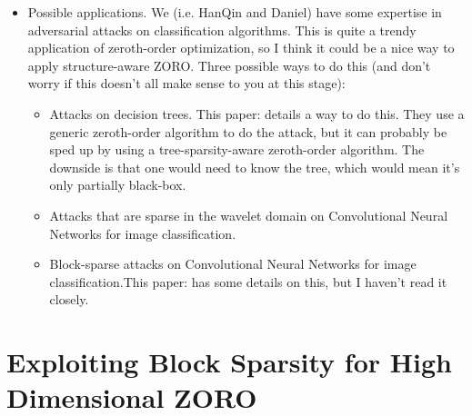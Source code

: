 \documentclass{article}
\begin{document}
\begin{itemize}
\item Possible applications. We (i.e. HanQin and Daniel) have some expertise in adversarial attacks on classification algorithms. This is quite a trendy application of zeroth-order optimization, so I think it could be a nice way to apply structure-aware ZORO. Three possible ways to do this (and don't worry if this doesn't all make sense to you at this stage):
	\begin{itemize}
		\item Attacks on decision trees. This paper: \cite{cheng2018query} details a way to do this. They use a generic zeroth-order algorithm to do the attack, but it can probably be sped up by using a tree-sparsity-aware zeroth-order algorithm. The downside is that one would need to know the tree, which would mean it's only partially black-box.
		\item Attacks that are sparse in the wavelet domain on Convolutional Neural Networks for image classification.
		\item Block-sparse attacks on Convolutional Neural Networks for image classification.This paper: \cite{xu2018structured} has some details on this, but I haven't read it closely.
	\end{itemize} 

\end{itemize}

\section{Exploiting Block Sparsity for High Dimensional ZORO}
\end{document}
